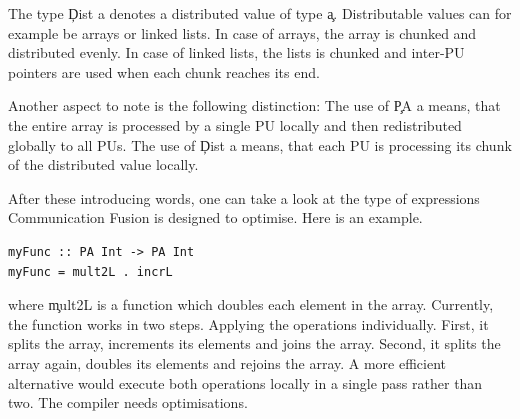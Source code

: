     The type \c{Dist a} denotes a distributed value of type \c{a}.
    Distributable values can for example be arrays or linked lists.
    In case of arrays, the array is chunked and distributed evenly.
    In case of linked lists, the lists is chunked and
    inter-PU pointers are used when each chunk reaches its end.
    
    Another aspect to note is the following distinction:
    The use of \c{PA a} means, that the entire array
    is processed by a single PU locally and
    then redistributed globally to all PUs.
    The use of \c{Dist a} means,
    that each PU is processing its
    chunk of the distributed value locally.
    
    After these introducing words, one can take a look at the type of expressions
    Communication Fusion is designed to optimise. Here is an example.
    \begin{lstlisting}
myFunc :: PA Int -> PA Int
myFunc = mult2L . incrL
    \end{lstlisting}
    where \c{mult2L} is a function which doubles each element in the array.
    Currently, the function works in two steps. Applying the operations individually.
    First, it splits the array, increments its elements and joins the array. Second, it splits
    the array again, doubles its elements and rejoins the array.
    A more efficient alternative would execute both operations locally
    in a single pass rather than two. The compiler needs optimisations.
    
